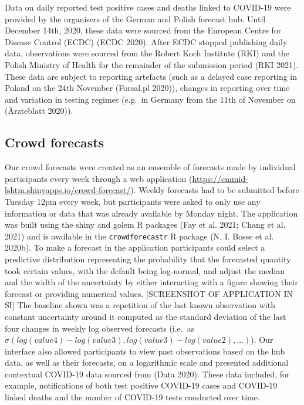 \documentclass[
]{article}
\begin{document}
Data on daily reported test positive cases and deaths linked to COVID-19 were provided by the organisers of the German and Polish forecast hub. Until December 14th, 2020, these data were sourced from the European Centre for Disease Control (ECDC) (ECDC 2020). After ECDC stopped publishing daily data, observations were sourced from the Robert Koch Institute (RKI) and the Polish Ministry of Health for the remainder of the submission period (RKI 2021). These data are subject to reporting artefacts (such as a delayed case reporting in Poland on the 24th November (Forsal.pl 2020)), changes in reporting over time and variation in testing regimes (e.g.~in Germany from the 11th of November on (Ärzteblatt 2020)).

\hypertarget{crowd-forecasts}{%
\subsection{Crowd forecasts}\label{crowd-forecasts}}

Our crowd forecasts were created as an ensemble of forecasts made by individual participants every week through a web application (\url{https://cmmid-lshtm.shinyapps.io/crowd-forecast/}). Weekly forecasts had to be submitted before Tuesday 12pm every week, but participants were asked to only use any information or data that was already available by Monday night. The application was built using the shiny and golem R packages (Fay et al. 2021; Chang et al. 2021) and is available in the \texttt{crowdforecastr} R package (N. I. Bosse et al. 2020b). To make a forecast in the application participants could select a predictive distribution representing the probability that the forecasted quantity took certain values, with the default being log-normal, and adjust the median and the width of the uncertainty by either interacting with a figure showing their forecast or providing numerical values. {[}SCREENSHOT OF APPLICATION IN SI{]} The baseline shown was a repetition of the last known observation with constant uncertainty around it computed as the standard deviation of the last four changes in weekly log observed forecasts (i.e.~as \(\sigma(log(value4) - log(value3), log(value3) - log(value2), \ldots )\)).
Our interface also allowed participants to view past observations based on the hub data, as well as their forecasts, on a logarithmic scale and presented additional contextual COVID-19 data sourced from (Data 2020). These data included, for example, notifications of both test positive COVID-19 cases and COVID-19 linked deaths and the number of COVID-19 tests conducted over time.
\end{document}
